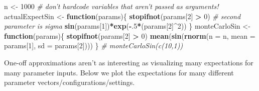 \documentclass[12pt,krantz2]{krantz}
\makeatletter
\newenvironment{Shaded}{\begin{snugshade}}{\end{snugshade}}
\newcommand{\CommentTok}[1]{\textcolor[rgb]{0.37,0.37,0.37}{\textit{#1}}}
\newcommand{\ControlFlowTok}[1]{\textcolor[rgb]{0.27,0.27,0.27}{\textbf{#1}}}
\newcommand{\DataTypeTok}[1]{\textcolor[rgb]{0.27,0.27,0.27}{#1}}
\newcommand{\DecValTok}[1]{\textcolor[rgb]{0.06,0.06,0.06}{#1}}
\newcommand{\KeywordTok}[1]{\textcolor[rgb]{0.27,0.27,0.27}{\textbf{#1}}}
\newcommand{\NormalTok}[1]{#1}
\newcommand{\OperatorTok}[1]{\textcolor[rgb]{0.43,0.43,0.43}{\textbf{#1}}}
\newcommand{\StringTok}[1]{\textcolor[rgb]{0.5,0.5,0.5}{#1}}
\newenvironment{kframe}{%
\medskip{}
\setlength{\fboxsep}{.8em}
 \def\at@end@of@kframe{}%
 \ifinner\ifhmode%
  \def\at@end@of@kframe{\end{minipage}}%
  \begin{minipage}{\columnwidth}%
 \fi\fi%
 \def\FrameCommand##1{\hskip\@totalleftmargin \hskip-\fboxsep
 \colorbox{shadecolor}{##1}\hskip-\fboxsep
     \hskip-\linewidth \hskip-\@totalleftmargin \hskip\columnwidth}%
 \MakeFramed {\advance\hsize-\width
   \@totalleftmargin\z@ \linewidth\hsize
   \@setminipage}}%
 {\par\unskip\endMakeFramed%
 \at@end@of@kframe}
\renewenvironment{Shaded}{\begin{kframe}}{\end{kframe}}
\makeatother
\begin{document}
\begin{Shaded}
\begin{Highlighting}[]
\NormalTok{n <-}\StringTok{ }\DecValTok{1000} \CommentTok{# don't hardcode variables that aren't passed as arguments!}
\NormalTok{actualExpectSin <-}\StringTok{ }\ControlFlowTok{function}\NormalTok{(params)\{}
  \KeywordTok{stopifnot}\NormalTok{(params[}\DecValTok{2}\NormalTok{] }\OperatorTok{>}\StringTok{ }\DecValTok{0}\NormalTok{) }\CommentTok{# second parameter is sigma}
  \KeywordTok{sin}\NormalTok{(params[}\DecValTok{1}\NormalTok{])}\OperatorTok{*}\KeywordTok{exp}\NormalTok{(}\OperatorTok{-}\NormalTok{.}\DecValTok{5}\OperatorTok{*}\NormalTok{(params[}\DecValTok{2}\NormalTok{]}\OperatorTok{^}\DecValTok{2}\NormalTok{))}
\NormalTok{\}}
\NormalTok{monteCarloSin <-}\StringTok{ }\ControlFlowTok{function}\NormalTok{(params)\{}
  \KeywordTok{stopifnot}\NormalTok{(params[}\DecValTok{2}\NormalTok{] }\OperatorTok{>}\StringTok{ }\DecValTok{0}\NormalTok{) }
  \KeywordTok{mean}\NormalTok{(}\KeywordTok{sin}\NormalTok{(}\KeywordTok{rnorm}\NormalTok{(}\DataTypeTok{n =}\NormalTok{ n, }\DataTypeTok{mean =}\NormalTok{ params[}\DecValTok{1}\NormalTok{], }\DataTypeTok{sd =}\NormalTok{ params[}\DecValTok{2}\NormalTok{])))}
\NormalTok{\}}
\CommentTok{# monteCarloSin(c(10,1))}
\end{Highlighting}
\end{Shaded}

One-off approximations aren't as interesting as visualizing many expectations for many parameter inputs. Below we plot the expectations for many different parameter vectors/configurations/settings.
\end{document}
